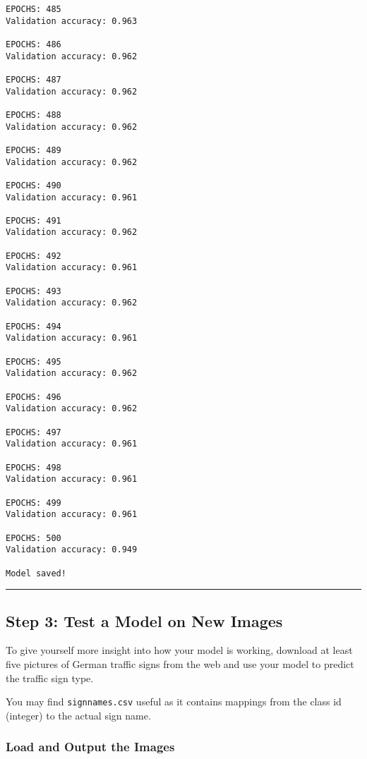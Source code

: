 \documentclass[11pt]{article}
\begin{document}
\begin{Verbatim}[commandchars=\\\{\}]
EPOCHS: 485
Validation accuracy: 0.963

EPOCHS: 486
Validation accuracy: 0.962

EPOCHS: 487
Validation accuracy: 0.962

EPOCHS: 488
Validation accuracy: 0.962

EPOCHS: 489
Validation accuracy: 0.962

EPOCHS: 490
Validation accuracy: 0.961

EPOCHS: 491
Validation accuracy: 0.962

EPOCHS: 492
Validation accuracy: 0.961

EPOCHS: 493
Validation accuracy: 0.962

EPOCHS: 494
Validation accuracy: 0.961

EPOCHS: 495
Validation accuracy: 0.962

EPOCHS: 496
Validation accuracy: 0.962

EPOCHS: 497
Validation accuracy: 0.961

EPOCHS: 498
Validation accuracy: 0.961

EPOCHS: 499
Validation accuracy: 0.961

EPOCHS: 500
Validation accuracy: 0.949

Model saved!

    \end{Verbatim}

    \begin{center}\rule{0.5\linewidth}{\linethickness}\end{center}

\hypertarget{step-3-test-a-model-on-new-images}{%
\subsection{Step 3: Test a Model on New
Images}\label{step-3-test-a-model-on-new-images}}

To give yourself more insight into how your model is working, download
at least five pictures of German traffic signs from the web and use your
model to predict the traffic sign type.

You may find \texttt{signnames.csv} useful as it contains mappings from
the class id (integer) to the actual sign name.

    \hypertarget{load-and-output-the-images}{%
\subsubsection{Load and Output the
Images}\label{load-and-output-the-images}}
\end{document}
